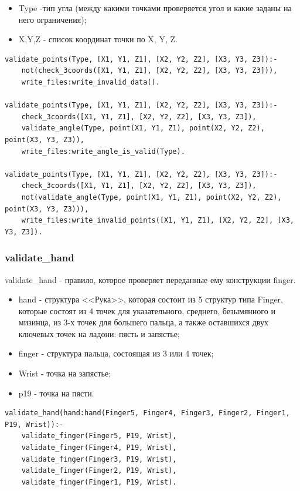 \begin{itemize}
	\item Type -тип угла (между какими точками проверяется угол и какие заданы на него ограничения);
	\item X,Y,Z - список координат точки по X, Y, Z.
\end{itemize}

\begin{lstlisting}[caption=Реализация правила validate\_points, label=rules:validatepoints]
validate_points(Type, [X1, Y1, Z1], [X2, Y2, Z2], [X3, Y3, Z3]):-
	not(check_3coords([X1, Y1, Z1], [X2, Y2, Z2], [X3, Y3, Z3])),
	write_files:write_invalid_data().

validate_points(Type, [X1, Y1, Z1], [X2, Y2, Z2], [X3, Y3, Z3]):-
	check_3coords([X1, Y1, Z1], [X2, Y2, Z2], [X3, Y3, Z3]),
	validate_angle(Type, point(X1, Y1, Z1), point(X2, Y2, Z2), point(X3, Y3, Z3)),
	write_files:write_angle_is_valid(Type).
	
validate_points(Type, [X1, Y1, Z1], [X2, Y2, Z2], [X3, Y3, Z3]):-
	check_3coords([X1, Y1, Z1], [X2, Y2, Z2], [X3, Y3, Z3]),
	not(validate_angle(Type, point(X1, Y1, Z1), point(X2, Y2, Z2), point(X3, Y3, Z3))),
	write_files:write_invalid_points([X1, Y1, Z1], [X2, Y2, Z2], [X3, Y3, Z3]).
\end{lstlisting}

\subsubsection{validate\_hand}
\hspace{0.6cm} validate\_hand - правило, которое проверяет переданные ему конструкции finger.

\begin{itemize}
	\item hand - структура <<Рука>>, которая состоит из 5 структур типа Finger, которые состоят из 4 точек для указательного, среднего, безымянного и мизинца, из 3-х точек для большего пальца, а также оставшихся двух ключевых точек на ладони: пясть и запястье;
	\item finger - структура пальца, состоящая из 3 или 4 точек;
	\item Wrist - точка на запястье;
	\item p19 - точка на пясти.
\end{itemize}

\begin{lstlisting}[caption=Реализация правила validate\_hand, label=rules:validatehand]
validate_hand(hand:hand(Finger5, Finger4, Finger3, Finger2, Finger1, P19, Wrist)):-
	validate_finger(Finger5, P19, Wrist),
	validate_finger(Finger4, P19, Wrist),
	validate_finger(Finger3, P19, Wrist),
	validate_finger(Finger2, P19, Wrist),
	validate_finger(Finger1, P19, Wrist).
\end{lstlisting}

